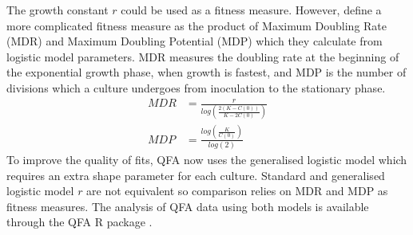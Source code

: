 The growth constant \(r\) could be used as a fitness measure. However,
\citet{Addinall2011} define a more complicated fitness measure as the
product of Maximum Doubling Rate (MDR) and Maximum Doubling Potential
(MDP) which they calculate from logistic model parameters. MDR measures
the doubling rate at the beginning of the exponential growth phase,
when growth is fastest, and MDP is the number of divisions which a
culture undergoes from inoculation to the stationary phase.
%
\begin{subequations}
  \label{eq:MDR_MDP}
    \begin{align}
      MDR &= \frac{r}{log\left(\frac{2(K-C(0))}{K-2C(0)}\right)}\\
      MDP &= \frac{log\left(\frac{K}{C(0)}\right)}{log(2)}
    \end{align}
\end{subequations}
%
To improve the quality of fits, QFA now uses the generalised logistic
model which requires an extra shape parameter for each
culture. Standard and generalised logistic model \(r\) are not
equivalent so comparison relies on MDR and MDP as fitness
measures. The analysis of QFA data using both models is available
through the QFA R package \citep{qfa2016}.





